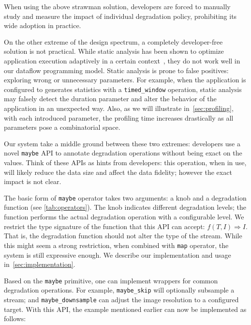 \vspace{0.5em}

When using the above strawman solution, developers are forced to manually study
and measure the impact of individual degradation policy, prohibiting its wide
adoption in practice.

On the other extreme of the design spectrum, a completely developer-free
solution is not practical. While static analysis has been shown to optimize
application execution adaptively in a certain context~\cite{chun2011clonecloud},
they do not work well in our dataflow programming model. Static analysis is
prone to false positives: exploring wrong or unnecessary parameters. For
example, when the application is configured to generates statistics with a
\texttt{timed\_window} operation, static analysis may falsely detect the
duration parameter and alter the behavior of the application in an unexpected
way. Also, as we will illustrate in~\autoref{sec:profiling}, with each
introduced parameter, the profiling time increases drastically as all parameters
pose a combinatorial space.

Our system take a middle ground between these two extremes: developers use a
novel \texttt{maybe} API to annotate degradation operations without being exact
on the values. Think of these APIs as hints from developers: this operation,
when in use, will likely reduce the data size and affect the data fidelity;
however the exact impact is not clear.

The basic form of \texttt{maybe} operator takes two arguments: a knob and a
degradation function (see \autoref{tab:operators}). The knob indicates different
degradation levels; the function performs the actual degradation operation with
a configurable level. We restrict the type signature of the function that this
API can accept: $f(T, I) \Rightarrow I$. That is, the degradation function
should not alter the type of the stream. While this might seem a strong
restriction, when combined with \texttt{map} operator, the system is still
expressive enough. We describe our implementation and usage
in~\autoref{sec:implementation}.

\begin{sloppypar}
  Based on the \texttt{maybe} primitive, one can implement wrappers for common
  degradation operations. For example, \texttt{maybe\_skip} will optionally
  subsample a stream; and \texttt{maybe\_downsample} can adjust the image
  resolution to a configured target. With this API, the example mentioned
  earlier can now be implemented as follows:
\end{sloppypar}

